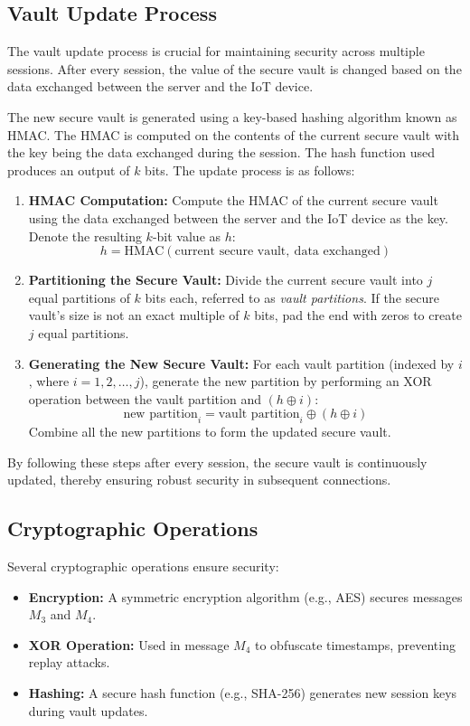 \documentclass[10pt,twocolumn,letterpaper]{article}
\begin{document}
\subsection{Vault Update Process}
The vault update process is crucial for maintaining security across multiple sessions. After every session, the value of the secure vault is changed based on the data exchanged between the server and the IoT device.

The new secure vault is generated using a key-based hashing algorithm known as HMAC. 
The HMAC is computed on the contents of the current secure vault with the key being the data exchanged during the session. The hash function used produces an output of $k$ bits. The update process is as follows:

\begin{enumerate}
    \item \textbf{HMAC Computation:}  
    Compute the HMAC of the current secure vault using the data exchanged between the server and the IoT device as the key. Denote the resulting $k$-bit value as $h$:
    \[
    h = \text{HMAC}(\text{current secure vault},\ \text{data exchanged})
    \]
    
    \item \textbf{Partitioning the Secure Vault:}  
    Divide the current secure vault into $j$ equal partitions of $k$ bits each, referred to as \emph{vault partitions}. If the secure vault's size is not an exact multiple of $k$ bits, pad the end with zeros to create $j$ equal partitions.
    
    \item \textbf{Generating the New Secure Vault:}  
    For each vault partition (indexed by $i$, where $i = 1, 2, \dots, j$), generate the new partition by performing an XOR operation between the vault partition and $(h \oplus i)$:
    \[
    \text{new partition}_i = \text{vault partition}_i \oplus (h \oplus i)
    \]
    Combine all the new partitions to form the updated secure vault.
    
\end{enumerate}

By following these steps after every session, the secure vault is continuously updated, thereby ensuring robust security in subsequent connections.

\subsection{Cryptographic Operations}
Several cryptographic operations ensure security:
\begin{itemize}
    \item \textbf{Encryption:} A symmetric encryption algorithm (e.g., AES) secures messages $M_3$ and $M_4$.
    \item \textbf{XOR Operation:} Used in message $M_4$ to obfuscate timestamps, preventing replay attacks.
    \item \textbf{Hashing:} A secure hash function (e.g., SHA-256) generates new session keys during vault updates.
\end{itemize}
\end{document}
